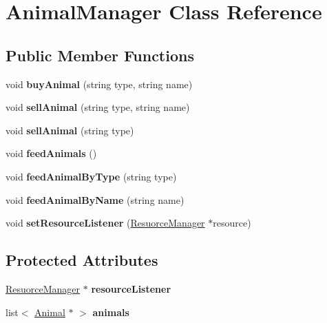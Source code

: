 \hypertarget{class_animal_manager}{}\section{Animal\+Manager Class Reference}
\label{class_animal_manager}
\subsection*{Public Member Functions}
\begin{DoxyCompactItemize}
\item 
\mbox{\label{class_animal_manager_a0c047e132bf297a8ecbe153783c7928f}} 
void {\bfseries buy\+Animal} (string type, string name)
\item 
\mbox{\label{class_animal_manager_a0706166b7609abae09369aedd309453e}} 
void {\bfseries sell\+Animal} (string type, string name)
\item 
\mbox{\label{class_animal_manager_ae81755971c331f3539a6bfd83e8f5d33}} 
void {\bfseries sell\+Animal} (string type)
\item 
\mbox{\label{class_animal_manager_a66ed845ca84b2044d20b6061f5e856c8}} 
void {\bfseries feed\+Animals} ()
\item 
\mbox{\label{class_animal_manager_a9d02ca95ac0cc06ce7f442f1e09d20f3}} 
void {\bfseries feed\+Animal\+By\+Type} (string type)
\item 
\mbox{\label{class_animal_manager_a6f5d8ff7e9032aefc52240c888dcc007}} 
void {\bfseries feed\+Animal\+By\+Name} (string name)
\item 
\mbox{\label{class_animal_manager_abc80d5035e94b824a4e331f64650601c}} 
void {\bfseries set\+Resource\+Listener} (\hyperlink{class_resuorce_manager}{Resuorce\+Manager} $\ast$resource)
\end{DoxyCompactItemize}
\subsection*{Protected Attributes}
\begin{DoxyCompactItemize}
\item 
\mbox{\label{class_animal_manager_a0f14e3b8559ae93d1dccdc311e8be1c8}} 
\hyperlink{class_resuorce_manager}{Resuorce\+Manager} $\ast$ {\bfseries resource\+Listener}
\item 
\mbox{\label{class_animal_manager_aa3faf53beeaa36ec92fc895b6a6311d4}} 
list$<$ \hyperlink{class_animal}{Animal} $\ast$ $>$ {\bfseries animals}
\end{DoxyCompactItemize}
